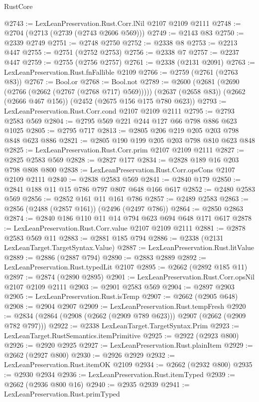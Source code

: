 \begin{lexlean}{RustCore}
\begin{coremodule}
@2743 := LexLeanPreservation.Rust.Corr.lNil @2107 @2109 @2111
@2748 := @2704 (@2713 (@2739 (@2743 @2606 @569)))
@2749 := @2143 @83
@2750 := @2339 @2749
@2751 := @2748 @2750
@2752 := @2338 @8
@2753 := @2213 @447
@2755 := @2751 (@2752 @2753)
@2756 := @2338 @7
@2757 := @2237 @447
@2759 := @2755 (@2756 @2757)
@2761 := @2338 (@2131 @2091)
@2763 := LexLeanPreservation.Rust.fnFallible @2109
@2766 := @2759 (@2761 (@2763 @83))
@2767 := Bool.or
@2768 := Bool.not
@2789 := @2600
    (@2681 (@2690 (@2766 (@2662 (@2767 (@2768 @717) @569)))))
    (@2637 (@2658 @83))
    (@2662 (@2666 @467 @156))
    (@2452 (@2675 @156 @175 @780 @623))
@2793 := LexLeanPreservation.Rust.Corr.cond @2107 @2109 @2111
@2795 := @2793 @2583 @569
@2804 := @2795 @569 @221 @244 @127 @66 @798 @886 @623 @1025
@2805 := @2795 @717
@2813 := @2805 @206 @219 @205 @203 @798 @848 @623 @886
@2821 := @2805 @190 @199 @205 @203 @798 @810 @623 @848
@2825 := LexLeanPreservation.Rust.Corr.prim @2107 @2109 @2111
@2827 := @2825 @2583 @569
@2828 := @2827 @177
@2834 := @2828 @189 @16 @203 @798 @808 @800
@2838 := LexLeanPreservation.Rust.Corr.opsCons @2107 @2109 @2111
@2840 := @2838 @2583 @569
@2841 := @2840 @179
@2850 := @2841 @188 @11 @15 @786 @797 @807 @648 @166 @617
@2852 := @2480 @2583 @569
@2856 := @2852 @161 @11 @161 @786
@2857 := @2489 @2583
@2863 := @2856 (@2488 (@2857 @161)) (@2496 (@2497 @786))
@2864 := @2850 @2863
@2874 := @2840 @186 @110 @11 @14 @794 @623 @694 @648 @171 @617
@2878 := LexLeanPreservation.Rust.Corr.value @2107 @2109 @2111
@2881 := @2878 @2583 @569 @11
@2883 := @2881 @185 @794
@2886 := @2338 (@2131 LexLeanTarget.TargetSyntax.Value)
@2887 := LexLeanPreservation.Rust.litValue
@2889 := @2886 (@2887 @794)
@2890 := @2883 @2889
@2892 := LexLeanPreservation.Rust.typedLit @2107
@2895 := @2662 (@2892 @185 @11)
@2897 := @2874 (@2890 @2895)
@2901 := LexLeanPreservation.Rust.Corr.opsNil @2107 @2109 @2111
@2903 := @2901 @2583 @569
@2904 := @2897 @2903
@2905 := LexLeanPreservation.Rust.isTemp
@2907 := @2662 (@2905 @648)
@2908 := @2904 @2907
@2909 := LexLeanPreservation.Rust.tempFresh
@2920 := @2834 (@2864 (@2908 (@2662 (@2909 @789 @623))) @2907 (@2662 (@2909 @782 @797)))
@2922 := @2338 LexLeanTarget.TargetSyntax.Prim
@2923 := LexLeanTarget.RustSemantics.itemPrimitive
@2925 := @2922 (@2923 @800)
@2926 := @2920 @2925
@2927 := LexLeanPreservation.Rust.plainItem
@2929 := @2662 (@2927 @800)
@2930 := @2926 @2929
@2932 := LexLeanPreservation.Rust.itemOK @2109
@2934 := @2662 (@2932 @800)
@2935 := @2930 @2934
@2936 := LexLeanPreservation.Rust.itemTyped
@2939 := @2662 (@2936 @800 @16)
@2940 := @2935 @2939
@2941 := LexLeanPreservation.Rust.primTyped

\end{coremodule}
\end{lexlean}
